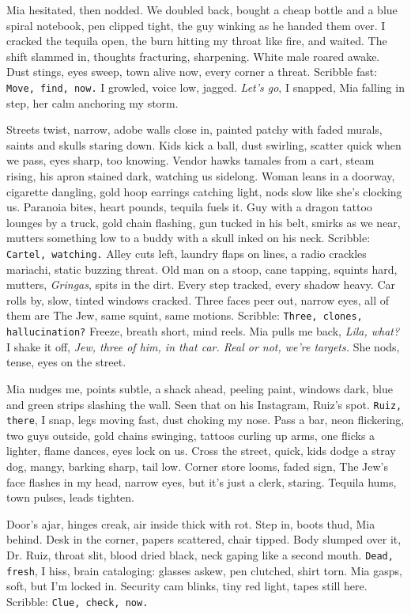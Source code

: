 \documentclass[12pt,oneside]{book}
\newcommand{\note}[1]{\texttt{#1}}
\begin{document}
Mia hesitated, then nodded. We doubled back, bought a cheap bottle and a blue spiral notebook, pen clipped tight, the guy winking as he handed them over. I cracked the tequila open, the burn hitting my throat like fire, and waited. The shift slammed in, thoughts fracturing, sharpening. White male roared awake. Dust stings, eyes sweep, town alive now, every corner a threat. Scribble fast: \note{Move, find, now.} I growled, voice low, jagged. \textit{Let’s go}, I snapped, Mia falling in step, her calm anchoring my storm.

Streets twist, narrow, adobe walls close in, painted patchy with faded murals, saints and skulls staring down. Kids kick a ball, dust swirling, scatter quick when we pass, eyes sharp, too knowing. Vendor hawks tamales from a cart, steam rising, his apron stained dark, watching us sidelong. Woman leans in a doorway, cigarette dangling, gold hoop earrings catching light, nods slow like she’s clocking us. Paranoia bites, heart pounds, tequila fuels it. Guy with a dragon tattoo lounges by a truck, gold chain flashing, gun tucked in his belt, smirks as we near, mutters something low to a buddy with a skull inked on his neck. Scribble: \note{Cartel, watching.} Alley cuts left, laundry flaps on lines, a radio crackles mariachi, static buzzing threat. Old man on a stoop, cane tapping, squints hard, mutters, \textit{Gringas}, spits in the dirt. Every step tracked, every shadow heavy. Car rolls by, slow, tinted windows cracked. Three faces peer out, narrow eyes, all of them are The Jew, same squint, same motions. Scribble: \note{Three, clones, hallucination?} Freeze, breath short, mind reels. Mia pulls me back, \textit{Lila, what?} I shake it off, \textit{Jew, three of him, in that car. Real or not, we’re targets.} She nods, tense, eyes on the street. 

Mia nudges me, points subtle, a shack ahead, peeling paint, windows dark, blue and green strips slashing the wall. Seen that on his Instagram, Ruiz’s spot. \note{Ruiz, there}, I snap, legs moving fast, dust choking my nose. Pass a bar, neon flickering, two guys outside, gold chains swinging, tattoos curling up arms, one flicks a lighter, flame dances, eyes lock on us. Cross the street, quick, kids dodge a stray dog, mangy, barking sharp, tail low. Corner store looms, faded sign, The Jew’s face flashes in my head, narrow eyes, but it’s just a clerk, staring. Tequila hums, town pulses, leads tighten.

Door’s ajar, hinges creak, air inside thick with rot. Step in, boots thud, Mia behind. Desk in the corner, papers scattered, chair tipped. Body slumped over it, Dr. Ruiz, throat slit, blood dried black, neck gaping like a second mouth. \note{Dead, fresh}, I hiss, brain cataloging: glasses askew, pen clutched, shirt torn. Mia gasps, soft, but I’m locked in. Security cam blinks, tiny red light, tapes still here. Scribble: \note{Clue, check, now.}
\end{document}
